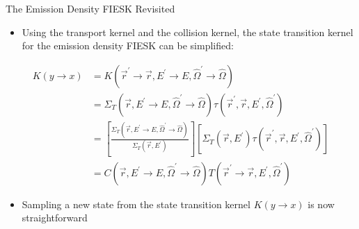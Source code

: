 \documentclass{beamer}
\begin{document}
\begin{frame}{The Emission Density FIESK Revisited}

  \begin{itemize}
    \item Using the transport kernel and the collision kernel, the state
      transition kernel for the emission density FIESK can be simplified:
  \end{itemize}
  \begin{align}
    K(y \to x) & = K(\vec{r}^{'} \to \vec{r}, E^{'} \to E, 
    \hat{\Omega}^{'} \to \hat{\Omega}) \nonumber \\
    & = \Sigma_T(\vec{r},E^{'} \to E, \hat{\Omega}^{'} \to \hat{\Omega})
    \tau(\vec{r}^{'},\vec{r},E^{'},\hat{\Omega}^{'}) \nonumber \\
    & = \left[
      \frac{\Sigma_T(\vec{r},E^{'} \to E, \hat{\Omega}^{'} \to \hat{\Omega})}
    {\Sigma_T(\vec{r},E^{'})} \right]\left[\Sigma_T(\vec{r},E^{'}) 
    \tau(\vec{r}^{'},\vec{r},E^{'},\hat{\Omega}^{'})\right] \nonumber \\
    & = C(\vec{r},E^{'} \to E,\hat{\Omega}^{'} \to \hat{\Omega})
    T(\vec{r}^{'} \to \vec{r},E^{'},\hat{\Omega}^{'}) \nonumber
  \end{align}

  \begin{itemize}
    \item Sampling a new state from the state transition kernel $K(y \to x)$
      is now straightforward
  \end{itemize}

\end{frame}
\end{document}
